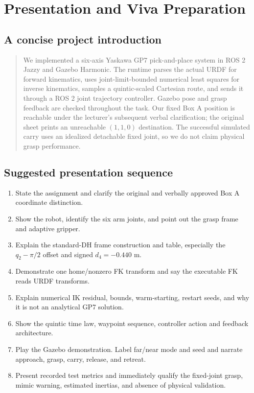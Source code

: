 \chapter{Presentation and Viva Preparation}
\label{ch:viva}

\section{A concise project introduction}
\begin{quote}
We implemented a six-axis Yaskawa GP7 pick-and-place system in ROS 2 Jazzy
and Gazebo Harmonic. The runtime parses the actual URDF for forward
kinematics, uses joint-limit-bounded numerical least squares for inverse
kinematics, samples a quintic-scaled Cartesian route, and sends it through a
ROS 2 joint trajectory controller. Gazebo pose and grasp feedback are checked
throughout the task. Our fixed Box A position is reachable under the
lecturer's subsequent verbal clarification; the original sheet prints an
unreachable $(1,1,0)$ destination. The successful simulated carry uses an
idealized detachable fixed joint, so we do not claim physical grasp
performance.
\end{quote}

\section{Suggested presentation sequence}
\begin{enumerate}
 \item State the assignment and clarify the original and verbally approved
 Box A coordinate distinction.
 \item Show the robot, identify the six arm joints, and point out the grasp
 frame and adaptive gripper.
 \item Explain the standard-DH frame construction and table, especially the
 $q_2-\pi/2$ offset and signed $d_4=-0.440$ m.
 \item Demonstrate one home/nonzero FK transform and say the executable FK
 reads URDF transforms.
 \item Explain numerical IK residual, bounds, warm-starting, restart seeds,
 and why it is not an analytical GP7 solution.
 \item Show the quintic time law, waypoint sequence, controller action and
 feedback architecture.
 \item Play the Gazebo demonstration. Label far/near mode and seed and narrate
 approach, grasp, carry, release, and retreat.
 \item Present recorded test metrics and immediately qualify the fixed-joint
 grasp, mimic warning, estimated inertias, and absence of physical validation.
\end{enumerate}


